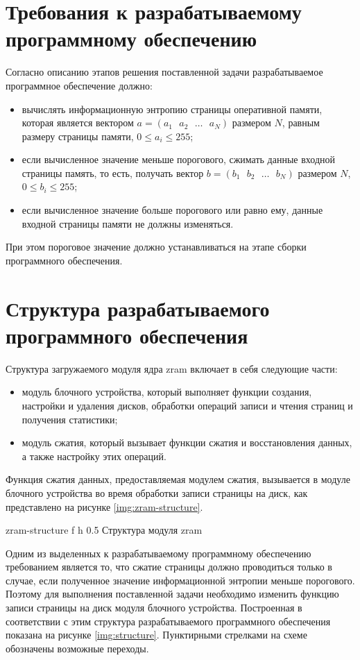 \section{Требования к разрабатываемому программному обеспечению}

Согласно описанию этапов решения поставленной задачи разрабатываемое программное обеспечение должно:

\begin{itemize}
	\item вычислять информационную энтропию страницы оперативной памяти, которая является вектором $a = (a_1\text{ }a_2\text{ }\dotso\text{ }a_N)$ размером $N$, равным размеру страницы памяти, $0 \leq a_i \leq 255$;
	\item если вычисленное значение меньше порогового, сжимать данные входной страницы память, то есть, получать вектор $b = (b_1\text{ }b_2\text{ }\dotso\text{ }b_N)$ размером $N$, $0 \leq b_i \leq 255$;
	\item если вычисленное значение больше порогового или равно ему, данные входной страницы памяти не должны изменяться.
\end{itemize}

При этом пороговое значение должно устанавливаться на этапе сборки программного обеспечения.

\section{Структура разрабатываемого программного обеспечения}

Структура загружаемого модуля ядра zram включает в себя следующие части:
\begin{itemize}
	\item модуль блочного устройства, который выполняет функции создания, настройки и удаления дисков, обработки операций записи и чтения страниц и получения статистики;
	\item модуль сжатия, который вызывает функции сжатия и восстановления данных, а также настройку этих операций.
\end{itemize}

Функция сжатия данных, предоставляемая модулем сжатия, вызывается в модуле блочного устройства во время обработки записи страницы на диск, как представлено на рисунке \ref{img:zram-structure}.

    {zram-structure}
    {f}
    {h}
    {0.5\textwidth}
    {Структура модуля zram}

Одним из выделенных к разрабатываемому программному обеспечению требованием является то, что сжатие страницы должно проводиться только в случае, если полученное значение информационной энтропии меньше порогового. Поэтому для выполнения поставленной задачи необходимо изменить функцию записи страницы на диск модуля блочного устройства. Построенная в соответствии с этим структура разрабатываемого программного обеспечения показана на рисунке \ref{img:structure}. Пунктирными стрелками на схеме обозначены возможные переходы.

